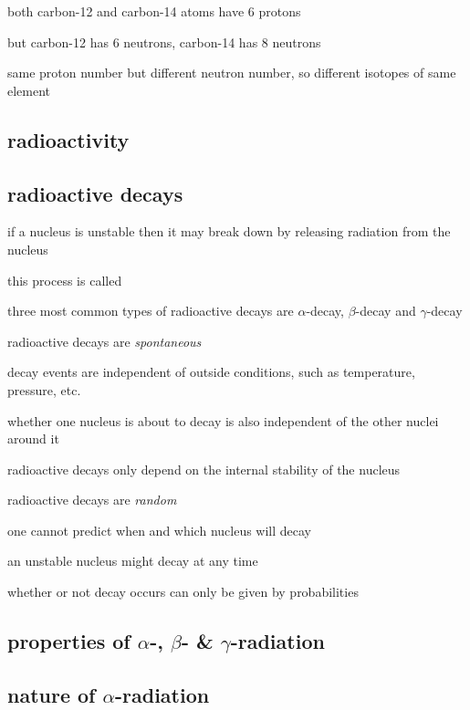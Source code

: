 \begin{soln} both carbon-12 and carbon-14 atoms have 6 protons

but carbon-12 has 6 neutrons, carbon-14 has 8 neutrons

same proton number but different neutron number, so different isotopes of same element \end{soln}




\subsection{radioactivity}

\subsection{radioactive decays}

if a nucleus is unstable then it may break down by releasing radiation from the nucleus

this process is called 

\cmt three most common types of radioactive decays are $\alpha$-decay, $\beta$-decay and $\gamma$-decay

\cmt radioactive decays are \emph{spontaneous}

decay events are independent of outside conditions, such as temperature, pressure, etc.

whether one nucleus is about to decay is also independent of the other nuclei around it

radioactive decays only depend on the internal stability of the nucleus

\cmt radioactive decays are \emph{random}

one cannot predict when and which nucleus will decay

an unstable nucleus might decay at any time

whether or not decay occurs can only be given by probabilities





\subsection{properties of $\alpha$-, $\beta$- \& $\gamma$-radiation}

\subsection*{nature of \texorpdfstring{$\alpha$}{\textalpha}-radiation}

